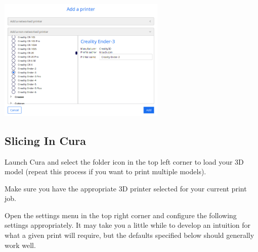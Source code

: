 \documentclass[12pt]{report}
\begin{document}
\begin{center}
    \includegraphics[width=0.6\textwidth]{add_printer.png}
\end{center}

\subsection*{Slicing In Cura}
\label{sec:slicing}

Launch Cura and select the folder icon in the top left corner to load your 3D
model (repeat this process if you want to print multiple models). \par
Make sure you have the appropriate 3D printer selected for your current print
job. \par
Open the settings menu in the top right corner and configure the following
settings appropriately. It may take you a little while to develop an intuition
for what a given print will require, but the defaults specified below should
generally work well.
\end{document}
